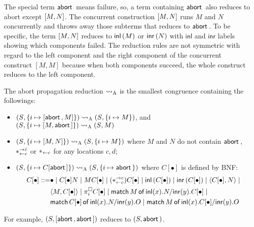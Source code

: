 The special term $\mathsf{abort\,}$ means failure, so, a term containing $\mathsf{abort\,}$
also reduces to abort except $[{M,N}]$.  The concurrent
construction $[{M,N}]$ runs $M$ and $N$ concurrently and throws
away those subterms that reduces to $\mathsf{abort\,}$.
To be specific, the term $[{M,N}]$ reduces to $\mathsf{inl}\left({M}\right)$
or $\mathsf{inr}\left({N}\right)$ with $\mathsf{inl}$ and
$\mathsf{inr}$ labels showing which components failed.
The reduction rules are not symmetric with regard to the left component
and the right component of the concurrent construct $[M, M]$ because
when both components succeed, the whole construct reduces to
the left component.
\begin{definition}
 The abort propagation reduction $\rightsquigarrow_{\mathrm A}$ is the smallest
 congruence containing the
 followings:
\begin{itemize}
 \item  $({S}{},{\{i\mapsto {[{\mathsf{abort\,}, M}]}\}})\rightsquigarrow_{\mathrm A}
 ({S}{},{\{i\mapsto {M}\}})$, and
   $({S}{},{\{i\mapsto {[{M,\mathsf{abort\,}}]}\}})\rightsquigarrow_{\mathrm A}
 ({S}{},{{M}})$
 \item $({S}{},{\{i\mapsto {[{M,N}]}\}})\rightsquigarrow_{\mathrm A} ({S}{},{\{i\mapsto {M}\}})$ where
       $M$ and $N$ do not contain $\mathsf{abort\,}$, $\ast^{\rightarrow {\bar{c}}}_{\leftarrow{c}}$ or $\ast_{\leftarrow{c}}$
       for any locations $c,d$;
 \item  $({S}{},{\{i\mapsto {C[\mathsf{abort\,}]}\}})\rightsquigarrow_{\mathrm A}
 ({S}{},{\{i\mapsto {\mathsf{abort\,}}\}})$  where $C[\bullet]$ is defined by BNF:
\begin{align*}
  C[\bullet] ::= &\bullet \mid
C[\bullet] N \mid
{M C[\bullet]}\mid
(\ast^{\rightarrow {c}}_{\leftarrow{c}})C[\bullet]\mid
\mathsf{inl}\left({C[\bullet]}\right)\mid
\mathsf{inr}\left({C[\bullet]}\right)\mid
\langle{C[\bullet], N}\rangle\mid \\&
\langle{M, C[\bullet]}\rangle\mid
\pi^\square_i{C[\bullet]}\mid
\mathsf{match}\,{M}\,\mathsf{of}\, \mathsf{inl}({x}). {N}/ \mathsf{inr}({y}). {C[\bullet]}\mid\\ &
\mathsf{match}\,{C[\bullet]}\,\mathsf{of}\, \mathsf{inl}({x}). {N}/ \mathsf{inr}({y}). {O}\mid
\mathsf{match}\,{M}\,\mathsf{of}\, \mathsf{inl}({x}). {C[\bullet]}/ \mathsf{inr}({y}). {O}
\end{align*}
\end{itemize}
\end{definition}
For example, $(S, [{\mathsf{abort\,},\mathsf{abort\,}}])$ reduces to $(S,
\mathsf{abort\,})$.

